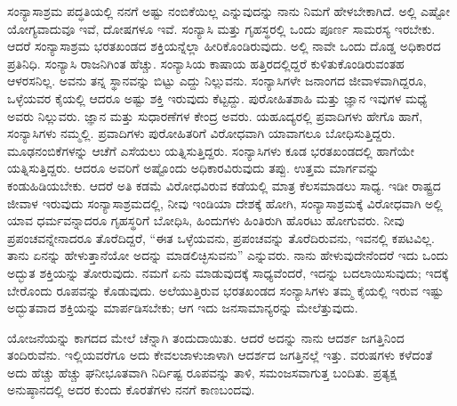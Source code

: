 ಸಂನ್ಯಾಸಾಶ್ರಮ ಪದ್ಧತಿಯಲ್ಲಿ ನನಗೆ ಅಷ್ಟು ನಂಬಿಕೆಯಿಲ್ಲ ಎನ್ನುವುದನ್ನು ನಾನು ನಿಮಗೆ ಹೇಳಬೇಕಾಗಿದೆ. ಅಲ್ಲಿ ಎಷ್ಟೋ ಯೋಗ್ಯವಾದುವೂ ಇವೆ, ದೋಷಗಳೂ ಇವೆ. ಸಂನ್ಯಾಸಿ ಮತ್ತು ಗೃಹಸ್ಥರಲ್ಲಿ ಒಂದು ಪೂರ್ಣ ಸಾಮರಸ್ಯ ಇರಬೇಕು. ಆದರೆ ಸಂನ್ಯಾಸಾಶ್ರಮ ಭರತಖಂಡದ ಶಕ್ತಿಯನ್ನೆಲ್ಲಾ ಹೀರಿಕೊಂಡಿರುವುದು. ಅಲ್ಲಿ ನಾವೇ ಒಂದು ದೊಡ್ಡ ಅಧಿಕಾರದ ಪ್ರತಿನಿಧಿ. ಸಂನ್ಯಾಸಿ ರಾಜನಿಗಿಂತ ಹೆಚ್ಚು. ಸಂನ್ಯಾಸಿಯ ಕಾಷಾಯ ಹತ್ತಿರದಲ್ಲಿದ್ದರೆ ಕುಳಿತುಕೊಂಡಿರುವಂತಹ ಆಳರಸನಿಲ್ಲ. ಅವನು ತನ್ನ ಸ್ಥಾನವನ್ನು ಬಿಟ್ಟು ಎದ್ದು ನಿಲ್ಲುವನು. ಸಂನ್ಯಾಸಿಗಳೇ ಜನಾಂಗದ ಜೀವಾಳವಾಗಿದ್ದರೂ, ಒಳ್ಳೆಯವರ ಕೈಯಲ್ಲಿ ಆದರೂ ಅಷ್ಟು ಶಕ್ತಿ ಇರುವುದು ಕೆಟ್ಟದ್ದು. ಪುರೋಹಿತಶಾಹಿ ಮತ್ತು ಜ್ಞಾನ ಇವುಗಳ ಮಧ್ಯೆ ಅವರು ನಿಲ್ಲುವರು. ಜ್ಞಾನ ಮತ್ತು ಸುಧಾರಣೆಗಳ ಕೇಂದ್ರ ಅವರು. ಯಹೂದ್ಯರಲ್ಲಿ ಪ್ರವಾದಿಗಳು ಹೇಗೊ ಹಾಗೆ, ಸಂನ್ಯಾಸಿಗಳು ನಮ್ಮಲ್ಲಿ. ಪ್ರವಾದಿಗಳು ಪುರೋಹಿತರಿಗೆ ವಿರೋಧವಾಗಿ ಯಾವಾಗಲೂ ಬೋಧಿಸುತ್ತಿದ್ದರು. ಮೂಢನಂಬಿಕೆಗಳನ್ನು ಆಚೆಗೆ ಎಸೆಯಲು ಯತ್ನಿಸುತ್ತಿದ್ದರು. ಸಂನ್ಯಾಸಿಗಳು ಕೂಡ ಭರತಖಂಡದಲ್ಲಿ ಹಾಗೆಯೇ ಯತ್ನಿಸುತ್ತಿದ್ದರು. ಆದರೂ ಅವರಿಗೆ ಅಷ್ಟೊಂದು ಅಧಿಕಾರವಿರುವುದು ತಪ್ಪು. ಉತ್ತಮ ಮಾರ್ಗವನ್ನು ಕಂಡುಹಿಡಿಯಬೇಕು. ಆದರೆ ಅತಿ ಕಡಮೆ ವಿರೋಧವಿರುವ ಕಡೆಯಲ್ಲಿ ಮಾತ್ರ ಕೆಲಸಮಾಡಲು ಸಾಧ್ಯ. ಇಡೀ ರಾಷ್ಟ್ರದ ಜೀವಾಳ ಇರುವುದು ಸಂನ್ಯಾಸಾಶ್ರಮದಲ್ಲಿ, ನೀವು ಇಂಡಿಯಾ ದೇಶಕ್ಕೆ ಹೋಗಿ, ಸಂನ್ಯಾಸಾಶ್ರಮಕ್ಕೆ ವಿರೋಧವಾಗಿ ಅಲ್ಲಿ ಯಾವ ಧರ್ಮವನ್ನಾದರೂ ಗೃಹಸ್ಥರಿಗೆ ಬೋಧಿಸಿ, ಹಿಂದುಗಳು ಹಿಂತಿರುಗಿ ಹೊರಟು ಹೋಗುವರು. ನೀವು ಪ್ರಪಂಚವನ್ನೇನಾದರೂ ತೊರೆದಿದ್ದರೆ, “ಈತ ಒಳ್ಳೆಯವನು, ಪ್ರಪಂಚವನ್ನು ತೊರೆದಿರುವನು, ಇವನಲ್ಲಿ ಕಪಟವಿಲ್ಲ. ತಾನು ಏನನ್ನು ಹೇಳುತ್ತಾನೆಯೋ ಅದನ್ನು ಮಾಡಲಿಚ್ಛಿಸುವನು” ಎನ್ನುವರು. ನಾನು ಹೇಳುವುದೇನೆಂದರೆ ಇದು ಒಂದು ಅದ್ಭುತ ಶಕ್ತಿಯನ್ನು ತೋರುವುದು. ನಮಗೆ ಏನು ಮಾಡುವುದಕ್ಕೆ ಸಾಧ್ಯವೆಂದರೆ, ಇದನ್ನು ಬದಲಾಯಿಸುವುದು; ಇದಕ್ಕೆ ಬೇರೊಂದು ರೂಪವನ್ನು ಕೊಡುವುದು. ಅಲೆಯುತ್ತಿರುವ ಭರತಖಂಡದ ಸಂನ್ಯಾಸಿಗಳು ತಮ್ಮ ಕೈಯಲ್ಲಿ ಇರುವ ಇಷ್ಟು ಅದ್ಭುತವಾದ ಶಕ್ತಿಯನ್ನು ಮಾರ್ಪಡಿಸಬೇಕು; ಆಗ ಇದು ಜನಸಾಮಾನ್ಯರನ್ನು ಮೇಲೆತ್ತುವುದು.

ಯೋಜನೆಯನ್ನು ಕಾಗದದ ಮೇಲೆ ಚೆನ್ನಾಗಿ ತಂದುದಾಯಿತು. ಆದರೆ ಅದನ್ನು ನಾನು ಆದರ್ಶ ಜಗತ್ತಿನಿಂದ ತಂದಿರುವೆನು. ಇಲ್ಲಿಯವರೆಗೂ ಅದು ಕೇವಲ\break ಜಾಳುಜಾಳಾಗಿ ಆದರ್ಶದ ಜಗತ್ತಿನಲ್ಲೆ ಇತ್ತು. ವರುಷಗಳು ಕಳೆದಂತೆ ಅದು ಹೆಚ್ಚು ಹೆಚ್ಚು ಘನೀಭೂತವಾಗಿ ನಿರ್ದಿಷ್ಟ ರೂಪವನ್ನು ತಾಳಿ, ಸಮಂಜಸವಾಗುತ್ತ ಬಂದಿತು. ಪ್ರತ್ಯಕ್ಷ ಅನುಷ್ಠಾನದಲ್ಲಿ ಅದರ ಕುಂದು ಕೊರತೆಗಳು ನನಗೆ ಕಾಣಬಂದವು.

